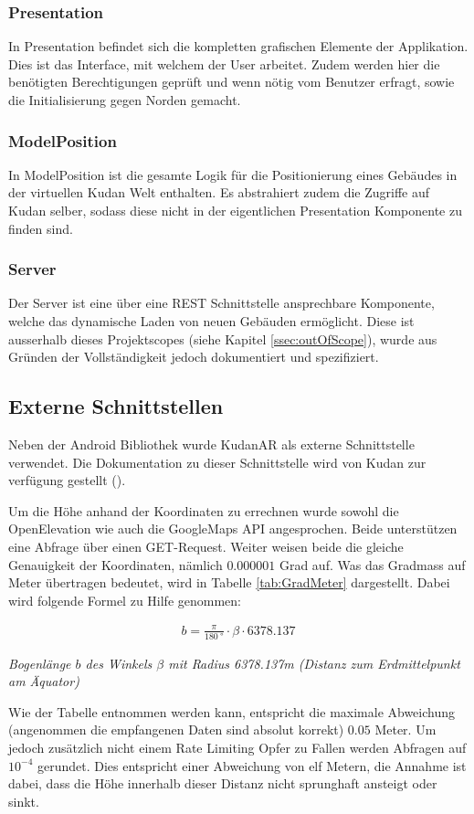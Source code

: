 \documentclass[a4paper]{scrreprt}
\newcommand{\myequations}[1]{
	\addcontentsline{equ}{myequations}{\protect\numberline{\theequation}#1}
}
\newcommand{\indexequation}[3]{
	\begin{align} \label{#3} \ensuremath{\boxed{#1}} \end{align}
	\myequations{#3} \centering \small \textit{#2} \normalsize \justify }
\begin{document}
\subsubsection{Presentation}
In Presentation befindet sich die kompletten grafischen Elemente der Applikation. Dies ist das Interface, mit welchem der User arbeitet. Zudem werden hier die benötigten Berechtigungen geprüft und wenn nötig vom Benutzer erfragt, sowie die Initialisierung gegen Norden gemacht. 

\subsubsection{ModelPosition}
In ModelPosition ist die gesamte Logik für die Positionierung eines Gebäudes in der virtuellen Kudan Welt enthalten. Es abstrahiert zudem die Zugriffe auf Kudan selber, sodass diese nicht in der eigentlichen Presentation Komponente zu finden sind.

\subsubsection{Server}
Der Server ist eine über eine REST Schnittstelle ansprechbare Komponente, welche das dynamische Laden von neuen Gebäuden ermöglicht. Diese ist ausserhalb dieses Projektscopes (siehe Kapitel \ref{ssec:outOfScope}), wurde aus Gründen der Vollständigkeit jedoch dokumentiert und spezifiziert.

\subsection{Externe Schnittstellen}
Neben der Android Bibliothek wurde KudanAR als externe Schnittstelle verwendet. Die Dokumentation zu dieser Schnittstelle wird von Kudan zur verfügung gestellt (\cite{KudanAPI}).

Um die Höhe anhand der Koordinaten zu errechnen wurde sowohl die OpenElevation wie auch die GoogleMaps API angesprochen. Beide unterstützen eine Abfrage über einen GET-Request. Weiter weisen beide die gleiche Genauigkeit der Koordinaten, nämlich $0.000 001$ Grad auf. Was das Gradmass auf Meter übertragen bedeutet, wird in Tabelle \ref{tab:GradMeter} dargestellt. Dabei wird folgende Formel zu Hilfe genommen:

\indexequation{b = \frac{\pi}{\SI{180}{\degree}}\cdot\beta\cdot 6378.137}{Bogenlänge $b$ des Winkels $\beta$ mit Radius 6378.137m (Distanz zum Erdmittelpunkt am Äquator)}{Bogenlaenge}

Wie der Tabelle entnommen werden kann, entspricht die maximale Abweichung (angenommen die empfangenen Daten sind absolut korrekt) $0.05$ Meter. Um jedoch zusätzlich nicht einem Rate Limiting Opfer zu Fallen werden Abfragen auf $10^{-4}$ gerundet. Dies entspricht einer Abweichung von elf Metern, die Annahme ist dabei, dass die Höhe innerhalb dieser Distanz nicht sprunghaft ansteigt oder sinkt.
\end{document}
